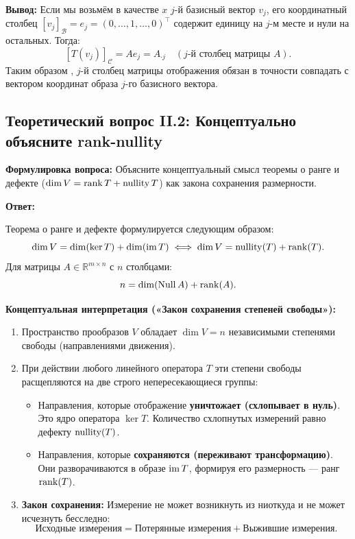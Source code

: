 \textbf{Вывод:} Если мы возьмём в качестве $x$ $j$-й базисный вектор $v_j$, его координатный столбец $[v_j]_\mathcal{B}
= e_j = (0, \dots, 1, \dots, 0)^\top$ содержит единицу на $j$-м месте и нули на остальных.
Тогда:
\[ [T(v_j)]_\mathcal{C} = A e_j = A_{\cdot j} \quad (\text{$j$-й столбец матрицы } A). \]
Таким образом , $j$-й столбец матрицы отображения обязан в точности совпадать с вектором координат образа $j$-го
базисного вектора.


\subsection{Теоретический вопрос II.2: Концептуально объясните rank-nullity}
\textbf{Формулировка вопроса:} Объясните концептуальный смысл теоремы о ранге и дефекте ($\dim V = \operatorname{rank} T + \operatorname{nullity}
T$) как закона сохранения размерности.

\textbf{Ответ:}

Теорема о ранге и дефекте формулируется следующим образом:
\[ \dim V = \dim(\ker T) + \dim(\operatorname{im} T) \iff \dim V = \operatorname{nullity}(T) + \operatorname{rank}(T). \]
Для матрицы $A \in \mathbb{R}^{m \times n}$ с $n$ столбцами:
\[ n = \dim(\operatorname{Null} A) + \operatorname{rank}(A). \]

\textbf{Концептуальная интерпретация («Закон сохранения степеней свободы»):}
\begin{enumerate}
    \item Пространство прообразов $V$ обладает $\dim V = n$ независимыми степенями свободы (направлениями движения).
    \item При действии любого линейного оператора $T$ эти степени свободы расщепляются на две строго
    непересекающиеся группы:
    \begin{itemize}
        \item Направления, которые отображение \textbf{уничтожает (схлопывает в нуль)}.
        Это ядро оператора $\ker T$.
        Количество схлопнутых измерений равно дефекту $\operatorname{nullity}(T)$.
        \item Направления, которые \textbf{сохраняются (переживают трансформацию)}.
        Они разворачиваются в образе $\operatorname{im} T$, формируя его размерность — ранг $\operatorname{rank}(T)$.
    \end{itemize}
    \item \textbf{Закон сохранения:} Измерение не может возникнуть из ниоткуда и не может исчезнуть бесследно:
    \[ \text{Исходные измерения} = \text{Потерянные измерения} + \text{Выжившие измерения}. \]
\end{enumerate}

